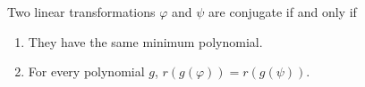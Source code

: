 Two linear transformations $\varphi$ and $\psi$ are conjugate if and only if
\begin{enumerate}
  \item[(i)] They have the same minimum polynomial.
  \item[(ii)] For every polynomial $g$, $r(g(\varphi)) = r(g(\psi))$.
\end{enumerate}
